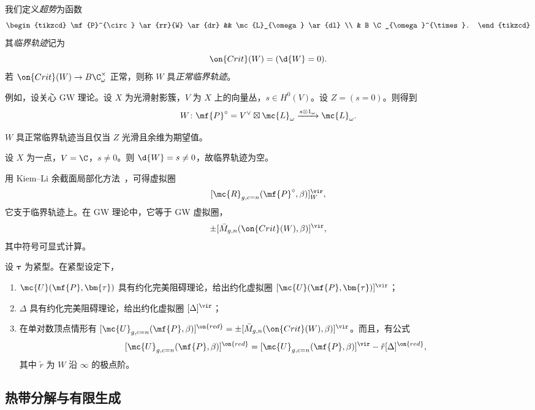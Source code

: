 我们定义\textit{超势}为函数
\begin{equation*}
\begin{tikzcd}
    \mf{P}^{\circ} \ar{rr}{W} \ar{dr} && \mc{L}_{\omega} \ar{dl} \\
    & B \C_{\omega}^{\times}.
\end{tikzcd}
\end{equation*}
其\textit{临界轨迹}记为
\[ \on{Crit}(W) = (\d{W} = 0). \]
若 \(\on{Crit}(W) \to B\C_{\omega}^{\times}\) 正常，则称 \(W\) 具\textit{正常临界轨迹}。

例如，设关心 GW 理论。设 \(X\) 为光滑射影簇，\(V\) 为 \(X\) 上的向量丛，\(s \in H^0(V)\)。设 \(Z = (s = 0)\)。则得到
\[ W \colon \mf{P}^{\circ} = V^{\vee} \boxtimes \mc{L}_{\omega} \xrightarrow{s \otimes 1_{\omega}} \mc{L}_{\omega}. \]

\begin{lem}
    \(W\) 具正常临界轨迹当且仅当 \(Z\) 光滑且余维为期望值。
\end{lem}

\begin{exm}
    设 \(X\) 为一点，\(V = \C\)，\(s \neq 0\)。则 \(\d{W} = s \neq 0\)，故临界轨迹为空。
\end{exm}

用 Kiem--Li 余截面局部化方法~\cite{KiemLi2013}，可得虚拟圈
\[ [\mc{R}_{g, c=n}(\mf{P}^{\circ}, \beta)]_W^{\vir}, \]
它支于临界轨迹上。在 GW 理论中，它等于 GW 虚拟圈，
\[ \pm [\bar{M}_{g,n}(\on{Crit}(W), \beta)]^{\vir}, \]
其中符号可显式计算。

\begin{thm}
    设 \(\bm{\tau}\) 为紧型。在紧型设定下，
    \begin{enumerate}
        \item \(\mc{U}(\mf{P}, \bm{\tau})\) 具有约化完美阻碍理论，给出约化虚拟圈 \([\mc{U}(\mf{P}, \bm{\tau})]^{\vir}\)；
        \item \(\Delta\) 具有约化完美阻碍理论，给出约化虚拟圈 \([\Delta]^{\vir}\)；
        \item 在单对数顶点情形有 \([\mc{U}_{g, c=n}(\mf{P}, \beta)]^{\on{red}} = \pm [\bar{M}_{g,n}(\on{Crit}(W), \beta)]^{\vir}\)。而且，有公式
            \[ [\mc{U}_{g, c=n}(\mf{P}, \beta)]^{\on{red}} = [\mc{U}_{g, c=n}(\mf{P}, \beta)]^{\vir} - \tilde{r} [\Delta]^{\on{red}}, \]
            其中 \(\tilde{r}\) 为 \(W\) 沿 \(\infty\) 的极点阶。
    \end{enumerate}
\end{thm}

\subsection{热带分解与有限生成}%
\label{sub:Tropical decomposition and finite generation}

